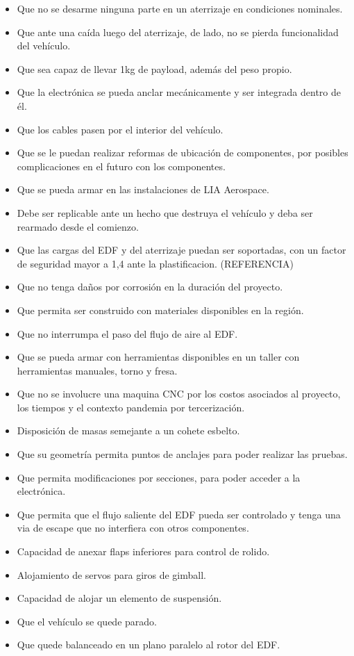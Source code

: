 \begin{itemize}
    \item Que no se desarme ninguna parte en un aterrizaje en condiciones nominales. 
    \item Que ante una caída luego del aterrizaje, de lado, no se pierda funcionalidad del vehículo.
    \item Que sea capaz de llevar 1kg de payload, además del peso propio.
    \item Que la electrónica se pueda anclar mecánicamente y ser integrada dentro de él.
    \item Que los cables pasen por el interior del vehículo.
    \item Que se le puedan realizar reformas de ubicación de componentes, por posibles complicaciones en el futuro con los componentes.
    \item Que se pueda armar en las instalaciones de LIA Aerospace.
    \item Debe ser replicable ante un hecho que destruya el vehículo y deba ser rearmado desde el comienzo.
    \item Que las cargas del EDF y del aterrizaje puedan ser soportadas, con un factor de seguridad mayor a 1,4 ante la plastificacion. (REFERENCIA)
    \item Que no tenga daños por corrosión en la duración del proyecto.
    \item Que permita ser construido con materiales disponibles en la región.
    \item Que no interrumpa el paso del flujo de aire al EDF.
    \item Que se pueda armar con herramientas disponibles en un taller con herramientas manuales, torno y fresa. 
    \item Que no se involucre una maquina CNC por los costos asociados al proyecto, los tiempos y el contexto pandemia por tercerización.
    \item Disposición de masas semejante a un cohete esbelto.
    \item Que su geometría permita puntos de anclajes para poder realizar las pruebas.
    \item Que permita modificaciones por secciones, para poder acceder a la electrónica.
    \item Que permita que el flujo saliente del EDF pueda ser controlado y tenga una via de escape que no interfiera con otros componentes.
    \item Capacidad de anexar flaps inferiores para control de rolido.
    \item Alojamiento de servos para giros de gimball.
    \item Capacidad de alojar un elemento de suspensión.
    \item Que el vehículo se quede parado.
    \item Que quede balanceado en un plano paralelo al rotor del EDF.
\end{itemize}

